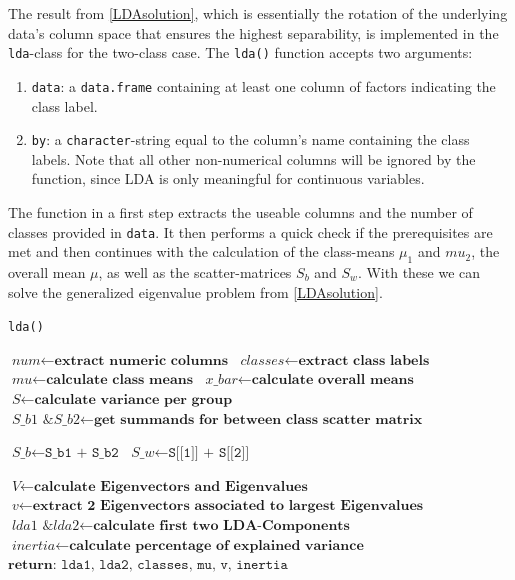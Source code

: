 \documentclass{article}
\begin{document}
The result from \ref{LDAsolution}, which is essentially the rotation of the underlying data's column space that ensures the highest separability, is implemented in the \texttt{lda}-class for the two-class case. The \texttt{lda()} function accepts two arguments:

\begin{enumerate}
\item \texttt{data}: a \texttt{data.frame} containing at least one column of factors indicating the class label.
\item \texttt{by}: a \texttt{character}-string equal to the column's name containing the class labels. Note that all other non-numerical columns will be ignored by the function, since LDA is only meaningful for continuous variables.
\end{enumerate} 

The function in a first step extracts the useable columns and the number of classes provided in \texttt{data}. It then performs a quick check if the prerequisites are met and then continues with the calculation of the class-means $\mu_1$ and $mu_2$, the overall mean $\mu$, as well as the scatter-matrices $S_b$ and $S_w$. With these we can solve the generalized eigenvalue problem from \ref{LDAsolution}.

\begin{algorithm}
\caption{\texttt{lda()}} \label{lda-function}
\begin{algorithmic}[1]
\State $\textit{num} \gets \textbf{extract numeric columns}$
\State $\textit{classes} \gets \textbf{extract class labels}$
\State $\textit{mu} \gets \textbf{calculate class means}$
\State $\textit{x\_bar} \gets \textbf{calculate overall means}$
\State $\textit{S} \gets \textbf{calculate variance per group}$
\State $\textit{S\_b1 \& S\_b2} \gets \textbf{get summands for between class scatter matrix}$
\EndProcedure

\State $\textit{S\_b} \gets \texttt{S\_b1 + S\_b2}$
\State $\textit{S\_w} \gets \texttt{S[[1]] + S[[2]]}$
\EndProcedure

\State $\textit{V} \gets \textbf{calculate Eigenvectors and Eigenvalues}$
\State $\textit{v} \gets \textbf{extract 2 Eigenvectors associated to largest Eigenvalues}$
\State $\textit{lda1 \& lda2} \gets \textbf{calculate first two LDA-Components}$
\State $\textit{inertia} \gets \textbf{calculate percentage of explained variance}$
\State $\textbf{return: } \texttt{lda1, lda2, classes, mu, v, inertia}$
\EndProcedure

\end{algorithmic}
\end{algorithm}
\end{document}
